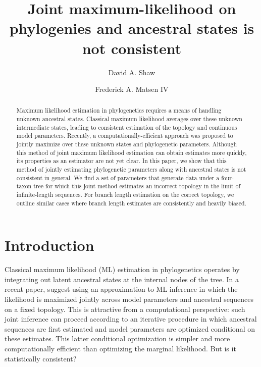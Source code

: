\documentclass{article}
\title{Joint maximum-likelihood on phylogenies and ancestral states is not consistent}
\author{David A. Shaw \and Frederick A. Matsen IV}
\begin{document}
\maketitle

\renewcommand{\arraystretch}{1.2} %

\begin{abstract}
Maximum likelihood estimation in phylogenetics requires a means of handling unknown ancestral states.
Classical maximum likelihood averages over these unknown intermediate states, leading to consistent estimation of the topology and continuous model parameters.
Recently, a computationally-efficient approach was proposed to jointly maximize over these unknown states and phylogenetic parameters.
Although this method of joint maximum likelihood estimation can obtain estimates more quickly, its properties as an estimator are not yet clear.
In this paper, we show that this method of jointly estimating phylogenetic parameters along with ancestral states is not consistent in general.
We find a set of parameters that generate data under a four-taxon tree for which this joint method estimates an incorrect topology in the limit of infinite-length sequences.
For branch length estimation on the correct topology, we outline similar cases where branch length estimates are consistently and heavily biased.
\end{abstract}

\section*{Introduction}

Classical maximum likelihood (ML) estimation in phylogenetics operates by integrating out latent ancestral states at the internal nodes of the tree.
In a recent paper, \cite{Sagulenko2017-jo} suggest using an approximation to ML inference in which the likelihood is maximized jointly across model parameters and ancestral sequences on a fixed topology.
This is attractive from a computational perspective: such joint inference can proceed according to an iterative procedure in which ancestral sequences are first estimated and model parameters are optimized conditional on these estimates.
This latter conditional optimization is simpler and more computationally efficient than optimizing the marginal likelihood.
But is it statistically consistent?
\end{document}
